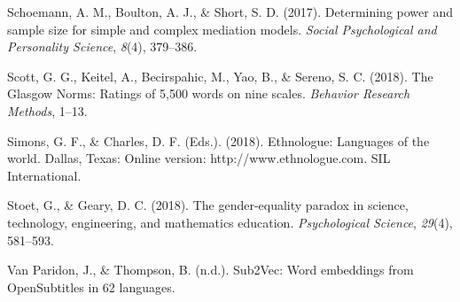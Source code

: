 \documentclass[man,floatsintext]{apa6}
\begin{document}
\leavevmode\hypertarget{ref-schoemann2017determining}{}%
Schoemann, A. M., Boulton, A. J., \& Short, S. D. (2017). Determining power and sample size for simple and complex mediation models. \emph{Social Psychological and Personality Science}, \emph{8}(4), 379--386.

\leavevmode\hypertarget{ref-scott2018glasgow}{}%
Scott, G. G., Keitel, A., Becirspahic, M., Yao, B., \& Sereno, S. C. (2018). The Glasgow Norms: Ratings of 5,500 words on nine scales. \emph{Behavior Research Methods}, 1--13.

\leavevmode\hypertarget{ref-simons2018}{}%
Simons, G. F., \& Charles, D. F. (Eds.). (2018). Ethnologue: Languages of the world. Dallas, Texas: Online version: http://www.ethnologue.com. SIL International.

\leavevmode\hypertarget{ref-stoet2018gender}{}%
Stoet, G., \& Geary, D. C. (2018). The gender-equality paradox in science, technology, engineering, and mathematics education. \emph{Psychological Science}, \emph{29}(4), 581--593.

\leavevmode\hypertarget{ref-vanparidon}{}%
Van Paridon, J., \& Thompson, B. (n.d.). Sub2Vec: Word embeddings from OpenSubtitles in 62 languages.

\endgroup
\end{document}
